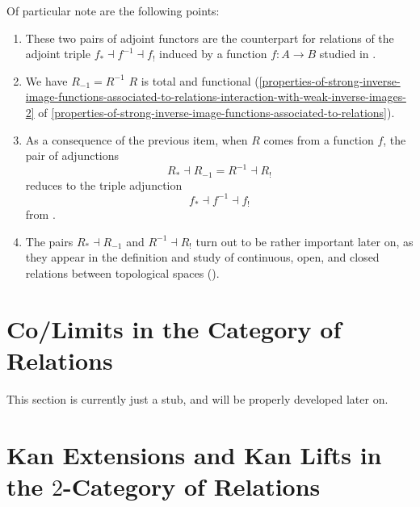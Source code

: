 \begin{enumerate}
        Of particular note are the following points:
        \begin{enumerate}
            \item These two pairs of adjoint functors are the counterpart for relations of the adjoint triple $f_{*}\dashv f^{-1}\dashv f_{!}$ induced by a function $f\colon A\to B$ studied in .
            \item We have $R_{-1}=R^{-1}$ \textiff $R$ is total and functional (\cref{properties-of-strong-inverse-image-functions-associated-to-relations-interaction-with-weak-inverse-images-2} of \cref{properties-of-strong-inverse-image-functions-associated-to-relations}).
            \item As a consequence of the previous item, when $R$ comes from a function $f$, the pair of adjunctions
                \[
                    R_{*}\dashv R_{-1}=R^{-1}\dashv R_{!}%
                \]%
                reduces to the triple adjunction
                \[
                    f_{*}\dashv f^{-1}\dashv f_{!}%
                \]%
                from .
            \item The pairs $R_{*}\dashv R_{-1}$ and $R^{-1}\dashv R_{!}$ turn out to be rather important later on, as they appear in the definition and study of continuous, open, and closed relations between topological spaces ().
        \end{enumerate}
\end{enumerate}

\ChapterTableOfContents

\section{Co/Limits in the Category of Relations}\label{section-co-limits-in-the-category-of-relations}
This section is currently just a stub, and will be properly developed later on.
\section{Kan Extensions and Kan Lifts in the $2$-Category of Relations}\label{section-kan-extensions-and-kan-lifts-in-the-2-category-of-relations}

